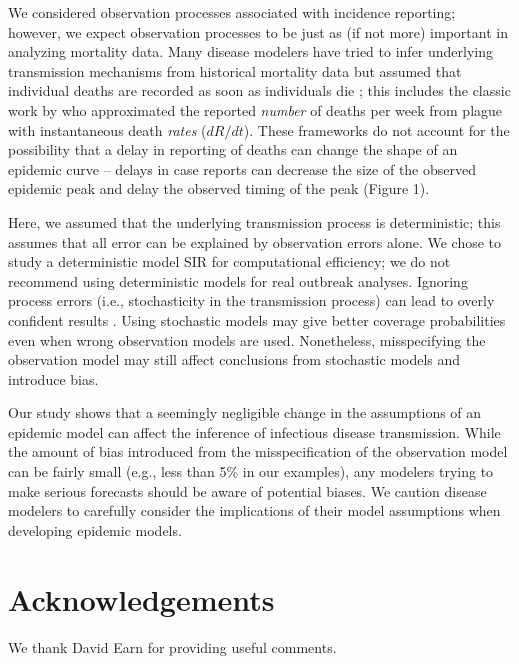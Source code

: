 \documentclass[12pt]{article}\usepackage[]{graphicx}\usepackage[]{color}
\begin{document}
We considered observation processes associated with incidence 
reporting; however, we expect observation processes to be just as 
(if not more) important in analyzing mortality data. Many disease modelers have
tried to infer underlying transmission mechanisms from historical mortality 
data but assumed that individual deaths are recorded as soon as individuals die 
\citep{he2013inferring, didelot2017model, dean2018human}; this includes the classic work by
\cite{kermack1927contribution} who approximated the reported \emph{number} of
deaths per week from plague with instantaneous death \emph{rates} ($dR/dt$).
These frameworks do not account for the possibility 
that a delay in reporting of deaths can
change the shape of an epidemic curve -- delays in case reports can decrease
the size of the observed epidemic peak and delay the observed timing of the peak (Figure 1). 

Here, we assumed that the underlying transmission process is deterministic; this 
assumes that all error can be explained by observation errors alone. 
We chose to study a deterministic model SIR for computational efficiency; 
we do not recommend using deterministic models for real outbreak analyses.
Ignoring process errors (i.e., stochasticity in the transmission process) can lead to
overly confident results \citep{king2015avoidable}. Using stochastic models may
give better coverage probabilities even when wrong observation models are used.
Nonetheless, misspecifying the observation model may still affect conclusions from 
stochastic models and introduce bias.

Our study shows that a seemingly negligible change in the assumptions of an epidemic
model can affect the inference of infectious disease transmission.
While the amount of bias introduced from the misspecification of the observation
model can be fairly small (e.g., less than 5\% in our examples), any modelers
trying to make serious forecasts should be aware of potential biases.
We caution disease modelers to carefully consider the implications of their model assumptions when developing epidemic models.

\section*{Acknowledgements}

We thank David Earn for providing useful comments.


\end{document}
